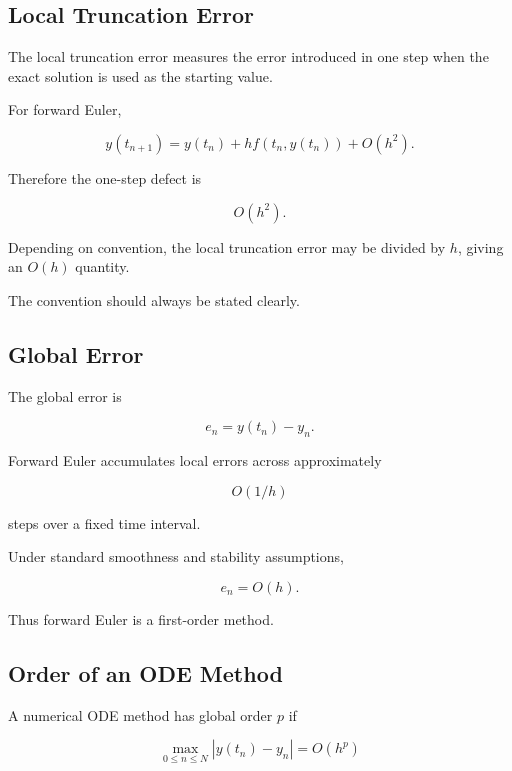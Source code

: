 \subsection{Local Truncation Error}
\label{subsec:ode-local-truncation-error}

The local truncation error measures the error introduced in one step when
the exact solution is used as the starting value.

For forward Euler,

\[
y(t_{n+1})
=
y(t_n)
+
hf(t_n,y(t_n))
+
O(h^2).
\]

Therefore the one-step defect is

\[
\boxed{
O(h^2).
}
\]

Depending on convention, the local truncation error may be divided by
\(h\), giving an \(O(h)\) quantity.

The convention should always be stated clearly.

\subsection{Global Error}
\label{subsec:ode-global-error}

The global error is

\[
\boxed{
e_n
=
y(t_n)-y_n.
}
\]

Forward Euler accumulates local errors across approximately

\[
O(1/h)
\]

steps over a fixed time interval.

Under standard smoothness and stability assumptions,

\[
\boxed{
e_n
=
O(h).
}
\]

Thus forward Euler is a first-order method.

\subsection{Order of an ODE Method}
\label{subsec:ode-method-order}

A numerical ODE method has global order \(p\) if

\[
\boxed{
\max_{0\leq n\leq N}
|y(t_n)-y_n|
=
O(h^p)
}
\]

